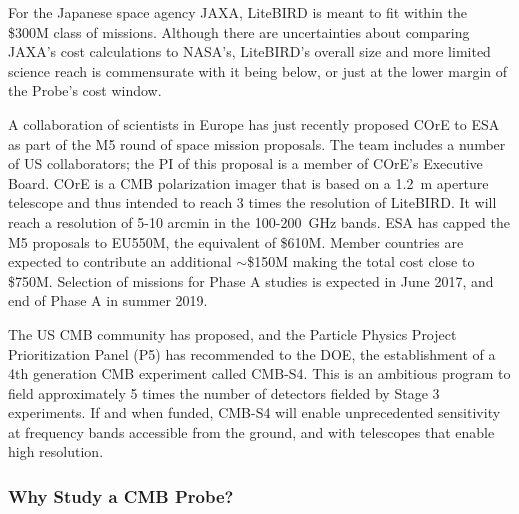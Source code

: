 For the Japanese space agency JAXA, LiteBIRD is meant to fit within the \$300M class of missions. 
Although there are uncertainties about comparing JAXA's cost calculations to NASA's, LiteBIRD's overall size 
and more limited science reach is commensurate with it being below, or just at the lower margin of the Probe's
cost window. 

A collaboration of scientists in Europe has just recently proposed COrE to ESA as part of the M5 round 
of space mission proposals. 
The team includes a number of US collaborators; the PI of this proposal is a member of 
COrE's Executive Board. COrE is a CMB polarization imager that is based on a 
1.2~m aperture telescope and thus intended to reach 3 times the resolution of LiteBIRD. 
It will reach a resolution of 5-10 arcmin in the 100-200~GHz bands. ESA has 
capped the M5 proposals to EU550M, the equivalent of 
\$610M. Member countries are expected to contribute an additional $\sim$\$150M making the total
cost close to \$750M. Selection of missions for Phase A studies is expected in June 2017, and
end of Phase A in summer 2019.

The US CMB community has proposed, and the Particle Physics Project Prioritization Panel (P5) has recommended 
to the DOE, the establishment of a 4th generation CMB experiment called CMB-S4. This is an ambitious 
program to field approximately 5 times the number of detectors fielded by Stage 3 experiments. If and when funded, 
CMB-S4 will enable unprecedented sensitivity at frequency bands accessible from the ground, and 
with telescopes that enable high resolution. 


\vspace{-0.18in}

\subsubsection{Why Study a CMB Probe?} 

\vspace{-0.05in}

